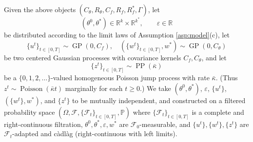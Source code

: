 \documentclass[11pt,letterpaper,reqno]{amsart}
\theoremstyle{definition}
\def\eps{\varepsilon}
\def\P{\mathbb{P}}
\def\R{\mathbb{R}}
\def\Pois{\operatorname{Poisson}}
\def\GP{\operatorname{GP}}
\def\PP{\operatorname{PP}}
\def\cF{\mathcal{F}}
\begin{document}
Given the above objects $(C_\theta,R_\theta,C_f,R_f,R_f^*,\Gamma)$, let
\begin{equation}\label{eq:thetaeps}
(\theta^0,\theta^*) \in \R^k \times \R^{k^*}, \qquad \eps \in \R
\end{equation}
be distributed according to the limit laws of Assumption \ref{asp:model}(c),
let
\begin{equation}\label{eq:GPs}
\{u^t\}_{t \in [0,T]} \sim \GP(0,C_f),
\quad (\{w^t\}_{t \in [0,T]},w^*) \sim \GP(0,C_\theta)
\end{equation}
be two centered Gaussian processes with covariance kernels $C_f,C_\theta$, and let
\begin{equation}\label{eq:poisson-z}
\{z^t\}_{t \in [0,T]} \sim \PP(\bar\kappa)
\end{equation}
be a $\{0,1,2,\ldots\}$-valued homogeneous Poisson jump process
with rate $\bar\kappa$. (Thus $z^t \sim \Pois(\bar\kappa t)$ marginally for each
$t \geq 0$.) We take
$(\theta^0,\theta^*)$, $\eps$, $\{u^t\}$, $(\{w^t\},w^*)$,
and $\{z^t\}$ to be mutually independent, and
constructed on a filtered probability space $(\Omega,\cF,\{\cF_t\}_{t \in
[0,T]},\P)$ where $\{\cF_t\}_{t \in [0,T]}$ is a complete and right-continuous
filtration, $\theta^0,\theta^*,\eps,w^*$ are $\cF_0$-measurable, and
$\{u^t\},\{w^t\},\{z^t\}$ are $\cF_t$-adapted and c\`adl\`ag (right-continuous
with left limits).
\end{document}
